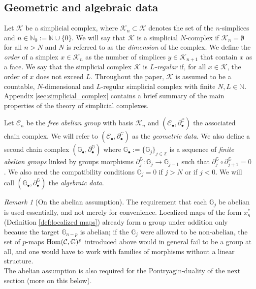 \documentclass[a4paper,12pt,twoside,reqno]{amsart}
\theoremstyle{plain}
\theoremstyle{definition}
\theoremstyle{remark}
\newtheorem{remark}[teo]{Remark}
\numberwithin{equation}{section}
\numberwithin{figure}{section}
\numberwithin{table}{section}
\newcommand{\f}[1]{\mathcal{#1}}
\newcommand{\n}[1]{\mathbb{#1}}
\begin{document}
	
	
	
	
	
	
	\subsection{Geometric and algebraic data}\label{sec:basic_F}
	Let $\f{K}$ be a simplicial complex, where $\f{K}_n\subset \f{K}$ denotes the set of the $n$-simplices
	and $n\in \n{N}_0:=\n{N}\cup\{0\}$. 
	We will say that $\f{K}$ is a simplicial $N$-complex if $\f{K}_n=\emptyset$ for all $n>N$ and $N$ is referred to as the \emph{dimension} of the complex. We define the \emph{order} of a simplex $x \in \f{K}_n$ as the number of simplices $ y \in \f{K}_{n+1}$ that contain $x$ as a face. We say that the simplicial complex $\f{K}$ is \emph{$L$-regular} if, for all $x \in \f{K}$, the order of $x$ does not exceed  $L$. Throughout the paper, $\f{K}$ is assumed to be a countable, $N$-dimensional and $L$-regular
	simplicial complex with finite  $N,L\in\n{N}$. Appendix \ref{sec:simplicial_complex} contains a brief 
	summary of the main properties of the theory of simplicial complexes.
	
	
	
	
	
	
	
	
	
	
	
	
	\medskip
	
	
	
	
	
	
	
	
	
	Let $\f{C}_n$ be the \emph{free abelian group} with basis $\f{K}_n$ and $(\f{C}_{\bullet},\partial_\bullet^\f{C})$
	the associated chain complex. We will refer to $(\f{C}_{\bullet},\partial_\bullet^\f{C})$ as the \emph{geometric data}.
	We also define a second chain complex $(\n{G}_\bullet ,\partial_\bullet ^\n{G})$ where $\n{G}_\bullet:=\{\n{G}_j\}_{j\in\n{Z}}$
	is a sequence of \emph{finite abelian groups} linked by  groups morphisms $\partial_{j}^\n{G}: \n{G}_j\to \n{G}_{j-1}$ such that   $\partial_j^\n{G} \circ \partial_{j+1}^\n{G}=0$. 
	We also need the compatibility conditions $\n{G}_j=0$ if $j>N$ or if $j<0$.  
	We will call 
	$(\n{G}_\bullet ,\partial_\bullet ^\n{G})$ the \emph{algebraic data}.
	
	\medskip
	
	
	\begin{remark}[On the abelian assumption]\label{rk:abelian}
		The requirement that each $\n{G}_j$ be abelian is used essentially, and not merely for convenience. Localized maps of the form $x^*_g$ (Definition \ref{def:localized maps}) already form a group under addition only because the target $\n{G}_{n-p}$ is abelian; if the $\n{G}_j$ were allowed to be non-abelian, the set of $p$-maps ${\rm Hom}(\f{C},\n{G})^p$ introduced above would in general fail to be a group at all, and one would have to work with families of morphisms without a linear structure.\\
		The abelian assumption is also required for the Pontryagin-duality
		of the next section (more on this below).
	\end{remark}
	
\end{document}
